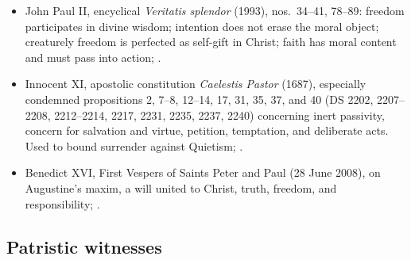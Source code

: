 {\begin{itemize}[itemsep=0pt,parsep=0pt,topsep=0.05em]
\item John Paul II, encyclical \emph{Veritatis splendor} (1993), nos.~34--41, 78--89: freedom participates in divine wisdom; intention does not erase the moral object; creaturely freedom is perfected as self-gift in Christ; faith has moral content and must pass into action; .
\item Innocent XI, apostolic constitution \emph{Caelestis Pastor} (1687), especially condemned propositions 2, 7--8, 12--14, 17, 31, 35, 37, and 40 (DS 2202, 2207--2208, 2212--2214, 2217, 2231, 2235, 2237, 2240) concerning inert passivity, concern for salvation and virtue, petition, temptation, and deliberate acts. Used to bound surrender against Quietism; .
\item Benedict XVI, First Vespers of Saints Peter and Paul (28 June 2008), on Augustine's maxim, a will united to Christ, truth, freedom, and responsibility; .
\end{itemize}}

\subsection*{Patristic witnesses}

